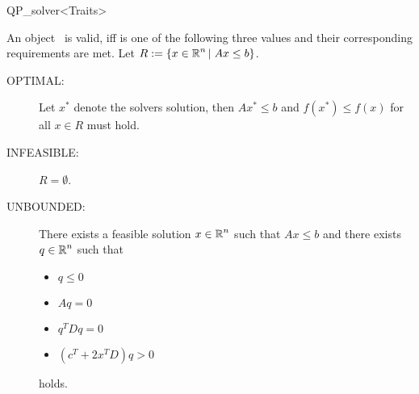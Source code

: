 \begin{ccRefClass}{QP_solver<Traits>}
\begin{ccIndexMemberFunctions}

\ccPredicates
{}


\ccModifiers
{}



An object \ccVar\ is valid, iff  is one of the following
three values and their corresponding requirements are met. Let
$R:=\{x \in \mbox{$\mathbb R$}^{n}\left|\right. Ax \leq b\}$.
\begin{description}
\item[OPTIMAL:] Let $x^{*}$ denote the solvers solution, then 
$Ax^{*} \leq b$ and $f(x^{*}) \leq f(x)$ for all $x \in R$ must hold.
\item[INFEASIBLE:] $R = \emptyset$.
\item[UNBOUNDED:] There exists a feasible solution $x \in \mbox{$\mathbb R$}^{n}$ such that
$Ax \leq b$ and there exists $q \in \mbox{$\mathbb R$}^{n}$ such that
  \begin{itemize}
    \item $q \leq 0$
    \item $Aq = 0$
    \item $q^{T}Dq=0$
    \item $(c^{T} + 2x^{T}D)q > 0$
  \end{itemize}
holds.
\end{description}




\end{ccIndexMemberFunctions}



\end{ccRefClass}
